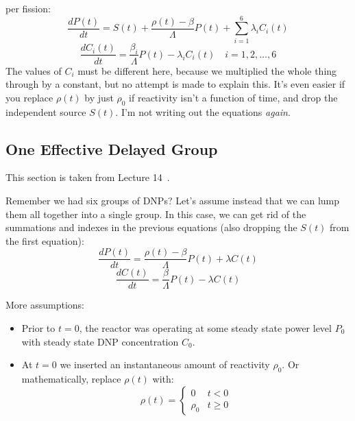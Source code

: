 \documentclass[letter]{article}
\begin{document}
per fission:
\begin{equation*}
      \frac{dP(t)}{dt}= S(t) + \frac{\rho(t)-\beta}{\Lambda}P(t)+\sum^6_{i=1}\lambda_iC_i(t)
\end{equation*}
\begin{equation*}
    \frac{dC_i(t)}{dt}=\frac{\beta_i}{\Lambda}P(t)-\lambda_iC_i(t)\quad i=1,2,\ldots,6
\end{equation*}
The values of $C_i$ must be different here, because we multiplied the
whole thing through by a constant, but no attempt is made to explain
this. It's even easier if you replace $\rho(t)$ by just $\rho_0$ if
reactivity isn't a function of time, and drop the independent source
$S(t)$. I'm not writing out the equations \textit{again}.

\subsection{One Effective Delayed Group}

This section is taken from Lecture 14~\cite{lecture}.

\vspace{10pt}
Remember we had six groups of DNPs? Let's assume instead that we can
lump them all together into a single group. In this case, we can get
rid of the summations and indexes in the previous equations (also
dropping the $S(t)$ from the first equation):
\begin{equation*}
      \frac{dP(t)}{dt}= \frac{\rho(t)-\beta}{\Lambda}P(t)+\lambda{}C(t)
\end{equation*}
\begin{equation*}
    \frac{dC(t)}{dt}=\frac{\beta}{\Lambda}P(t)-\lambda{}C(t)
\end{equation*}

More assumptions:
\begin{itemize}
\item Prior to $t=0$, the reactor was operating at some steady state
  power level $P_0$ with steady state DNP concentration $C_0$.
\item At $t=0$ we inserted an instantaneous amount of reactivity
  $\rho_0$. Or mathematically, replace $\rho(t)$ with:
  \begin{equation*}
    \rho(t)=
    \begin{cases}
      0 & t < 0 \\
      \rho_0 & t \geq 0
    \end{cases}
  \end{equation*}
\end{itemize}
\end{document}

